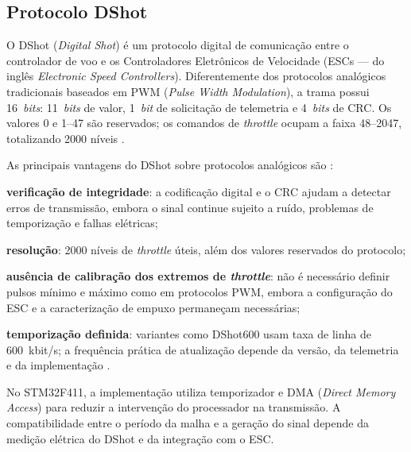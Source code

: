 

\subsection{Protocolo DShot}\label{subsec:dshot}

O DShot (\textit{Digital Shot}) é um protocolo digital de comunicação entre o controlador de voo e os Controladores Eletrônicos de Velocidade (ESCs --- do inglês \textit{Electronic Speed Controllers}). Diferentemente dos protocolos analógicos tradicionais baseados em PWM (\textit{Pulse Width Modulation}), a trama possui 16~\textit{bits}: 11~\textit{bits} de valor, 1~\textit{bit} de solicitação de telemetria e 4~\textit{bits} de CRC. Os valores 0 e 1--47 são reservados; os comandos de \textit{throttle} ocupam a faixa 48--2047, totalizando 2000 níveis \cite{betaflightdshot}.

As principais vantagens do DShot sobre protocolos analógicos são \cite{idrissi2022}:

\begin{alineastcc}
    \item \textbf{verificação de integridade}: a codificação digital e o CRC ajudam a detectar erros de transmissão, embora o sinal continue sujeito a ruído, problemas de temporização e falhas elétricas;
    \item \textbf{resolução}: 2000 níveis de \textit{throttle} úteis, além dos valores reservados do protocolo;
    \item \textbf{ausência de calibração dos extremos de \textit{throttle}}: não é necessário definir pulsos mínimo e máximo como em protocolos PWM, embora a configuração do ESC e a caracterização de empuxo permaneçam necessárias;
    \item \textbf{temporização definida}: variantes como DShot600 usam taxa de linha de 600~kbit/s; a frequência prática de atualização depende da versão, da telemetria e da implementação \cite{betaflightdshot}.
\end{alineastcc}

No STM32F411, a implementação utiliza temporizador e DMA (\textit{Direct Memory Access}) para reduzir a intervenção do processador na transmissão. A compatibilidade entre o período da malha e a geração do sinal depende da medição elétrica do DShot e da integração com o ESC.

